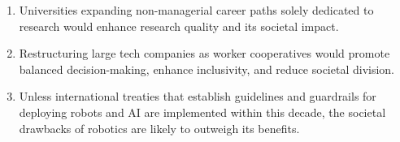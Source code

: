 \documentclass{propositions}
\begin{document}
\begin{enumerate}
    \item Universities expanding non-managerial career paths solely dedicated to research would enhance research quality and its societal impact.
    \item %
    Restructuring large tech companies as worker cooperatives would promote balanced decision-making, enhance inclusivity, and reduce societal division.
    \item %
    Unless international treaties that establish guidelines and guardrails for deploying robots and AI are implemented within this decade, the societal drawbacks of robotics are likely to outweigh its benefits. 
\end{enumerate}
\end{document}
